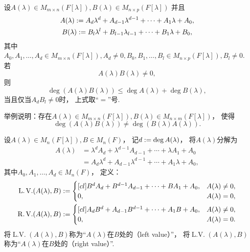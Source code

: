 \begin{lemma}
设\(
	A(\lambda) \in M_{m \times n}(F[\lambda]),
	B(\lambda) \in M_{n \times p}(F[\lambda])
\)
并且\begin{gather*}
	A(\lambda) := A_d \lambda^d + A_{d-1} \lambda^{d-1} + \dotsb + A_1 \lambda + A_0, \\
	B(\lambda) := B_l \lambda^l + B_{l-1} \lambda_{l-1} + \dotsb + B_1 \lambda + B_0,
\end{gather*}
其中\(
	A_0,A_1,\dotsc,A_d
	\in M_{m \times n}(F[\lambda]),
	A_d \neq 0,
	B_0,B_1,\dotsc,B_l
	\in M_{n \times p}(F[\lambda]),
	B_l \neq 0
\).
若\begin{equation*}
	A(\lambda) B(\lambda) \neq 0,
\end{equation*}
则\begin{equation*}
	\deg( A(\lambda) B(\lambda) )
	\leq \deg A(\lambda) + \deg B(\lambda),
\end{equation*}
当且仅当\(A_d B_l \neq 0\)时，
上式取“\(=\)”号.
\end{lemma}

\begin{example}
举例说明：存在\(
	A(\lambda) \in M_{m \times n}(F[\lambda]),
	B(\lambda) \in M_{n \times m}(F[\lambda])
\)，
使得\begin{equation*}
	\deg( A(\lambda) B(\lambda) )
	\neq
	\deg( B(\lambda) A(\lambda) ).
\end{equation*}
\end{example}

\begingroup

\def\LV{\operatorname{L.V.}}
\def\RV{\operatorname{R.V.}}
\begin{definition}
设\(
	A(\lambda) \in M_n(F[\lambda]),
	B \in M_n(F)
\)，
记\(d := \deg A(\lambda)\)，
将\(A(\lambda)\)分解为\begin{align*}
	A(\lambda)
	&= \lambda^d A_d
	+ \lambda^{d-1} A_{d-1}
	+ \dotsb
	+ \lambda A_1
	+ A_0 \\
	&= A_d \lambda^d
	+ A_{d-1} \lambda^{d-1}
	+ \dotsb
	+ A_1 \lambda
	+ A_0,
\end{align*}
其中\(
	A_0,A_1,\dotsc,A_d
	\in M_n(F)
\)，
定义：\begin{align*}
	\LV(A(\lambda), B)
	&\defeq
	\begin{cases}[cl]
		B^d A_d
		+ B^{d-1} A_{d-1}
		+ \dotsb
		+ B A_1
		+ A_0,
		& A(\lambda) \neq 0, \\
		0,
		& A(\lambda) = 0,
	\end{cases}
	\\
	\RV(A(\lambda), B)
	&\defeq
	\begin{cases}[cl]
		A_d B^d
		+ A_{d-1} B^{d-1}
		+ \dotsb
		+ A_1 B
		+ A_0,
		& A(\lambda) \neq 0, \\
		0,
		& A(\lambda) = 0.
	\end{cases}
\end{align*}
将\(\LV(A(\lambda), B)\)称为“\(A(\lambda)\)在\(B\)处的（left value）”，
将\(\LV(A(\lambda), B)\)称为“\(A(\lambda)\)在\(B\)处的（right value）”.
\end{definition}

